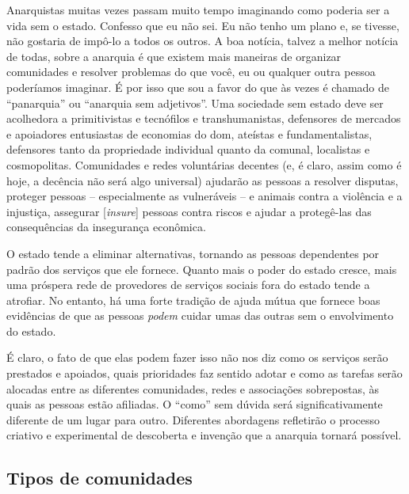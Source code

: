 Anarquistas muitas vezes passam muito tempo imaginando como poderia ser a vida sem o estado. Confesso que eu não sei. Eu não tenho um plano e, se tivesse, não gostaria de impô-lo a todos os outros. A boa notícia, talvez a melhor notícia de todas, sobre a anarquia é que existem mais maneiras de organizar comunidades e resolver problemas do que você, eu ou qualquer outra pessoa poderíamos imaginar. É por isso que sou a favor do que às vezes é chamado de ``panarquia'' ou ``anarquia sem adjetivos''. Uma sociedade sem estado deve ser acolhedora a primitivistas e tecnófilos e transhumanistas, defensores de mercados e apoiadores entusiastas de economias do dom, ateístas e fundamentalistas, defensores tanto da propriedade individual quanto da comunal, localistas e cosmopolitas. Comunidades e redes voluntárias decentes (e, é claro, assim como é hoje, a decência não será algo universal) ajudarão as pessoas a resolver disputas, proteger pessoas -- especialmente as vulneráveis -- e animais contra a violência e a injustiça, assegurar [\emph{insure}] pessoas contra riscos e ajudar a protegê-las das consequências da insegurança econômica.

O estado tende a eliminar alternativas, tornando as pessoas dependentes por padrão dos serviços que ele fornece. Quanto mais o poder do estado cresce, mais uma próspera rede de provedores de serviços sociais fora do estado tende a atrofiar. No entanto, há uma forte tradição de ajuda mútua que fornece boas evidências de que as pessoas \emph{podem} cuidar umas das outras sem o envolvimento do estado.

É claro, o fato de que elas podem fazer isso não nos diz como os serviços serão prestados e apoiados, quais prioridades faz sentido adotar e como as tarefas serão alocadas entre as diferentes comunidades, redes e associações sobrepostas, às quais as pessoas estão afiliadas. O ``como'' sem dúvida será significativamente diferente de um lugar para outro. Diferentes abordagens refletirão o processo criativo e experimental de descoberta e invenção que a anarquia tornará possível.

\subsection*{Tipos de comunidades}

